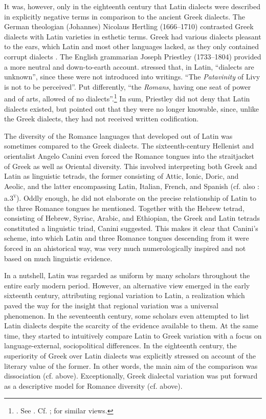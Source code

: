 It was, however, only in the eighteenth century that Latin dialects were described in explicitly negative terms in comparison to the ancient Greek dialects. The German theologian (Johannes) Nicolaus Hertling (1666–1710) contrasted Greek dialects with Latin varieties in esthetic terms. Greek had various dialects pleasant to the ears, which Latin and most other languages lacked, as they only contained corrupt dialects \citep[73]{Hertling1708}. The English grammarian Joseph Priestley (1733–1804) provided a more neutral and down-to-earth account. \citet[138]{Priestley1762} stressed that, in Latin, “dialects are unknown”, since these were not introduced into writings. “The \textit{Patavinity} of Livy is not to be perceived”. Put differently, “the \textit{Romans}, having one seat of power and of arts, allowed of no dialects”.\footnote{\citet[280]{Priestley1762}. See \citet[52]{Amsler1993}. Cf. \citet[49]{Galiani1779}; \citet[203--205]{Ries1786} for similar views.} In sum, Priestley did not deny that Latin dialects existed, but pointed out that they were no longer knowable, since, unlike the Greek dialects, they had not received written codification.

The diversity of the Romance languages that developed out of Latin was sometimes compared to the Greek dialects. The sixteenth-century Hellenist and orientalist Angelo Canini even forced the Romance tongues into the straitjacket of Greek as well as Oriental diversity. This involved \citet[\textsc{a}.iii\textsc{\textsuperscript{r}}]{Canini1554} interpreting both Greek and Latin as linguistic tetrads, the former consisting of Attic, Ionic, Doric, and Aeolic, and the latter encompassing Latin, Italian, French, and Spanish (cf. also \citealt{Canini1555}: a.3\textsc{\textsuperscript{v}}). Oddly enough, he did not elaborate on the precise relationship of Latin to the three Romance tongues he mentioned. Together with the Hebrew tetrad, consisting of Hebrew, Syriac, Arabic, and Ethiopian, the Greek and Latin tetrads constituted a linguistic triad, Canini suggested. This makes it clear that Canini’s scheme, into which Latin and three Romance tongues descending from it were forced in an ahistorical way, was very much numerologically inspired and not based on much linguistic evidence.

In a nutshell, Latin was regarded as uniform by many scholars throughout the entire early modern period. However, an alternative view emerged in the early sixteenth century, attributing regional variation to Latin, a realization which paved the way for the insight that regional variation was a universal phenomenon. In the seventeenth century, some scholars even attempted to list Latin dialects despite the scarcity of the evidence available to them. At the same time, they started to intuitively compare Latin to Greek variation with a focus on language-external, sociopolitical differences. In the eighteenth century, the superiority of Greek over Latin dialects was explicitly stressed on account of the literary value of the former. In other words, the main aim of the comparison was dissociation (cf.  above). Exceptionally, Greek dialectal variation was put forward as a descriptive model for Romance diversity (cf.  above).

